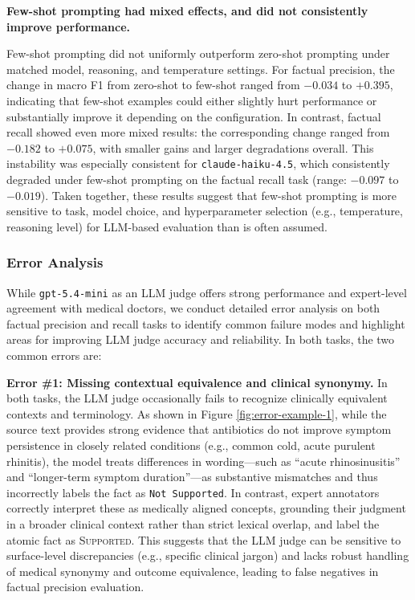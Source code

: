\documentclass{article}
\newcommand{\xhdr}[1]{%
  \noindent\textbf{#1.}
}
\begin{document}
\xhdr{Few-shot prompting had mixed effects, and did not consistently improve performance}
Few-shot prompting did not uniformly outperform zero-shot prompting under matched model, reasoning, and temperature settings. For factual precision, the change in macro F1 from zero-shot to few-shot ranged from $-0.034$ to $+0.395$, indicating that few-shot examples could either slightly hurt performance or substantially improve it depending on the configuration. In contrast, factual recall showed even more mixed results: the corresponding change ranged from $-0.182$ to $+0.075$, with smaller gains and larger degradations overall. This instability was especially consistent for \texttt{claude-haiku-4.5}, which consistently degraded under few-shot prompting on the factual recall task (range: $-0.097$ to $-0.019$). Taken together, these results suggest that few-shot prompting is more sensitive to task, model choice, and hyperparameter selection (e.g., temperature, reasoning level) for LLM-based evaluation than is often assumed.


\subsubsection{Error Analysis}\label{appendix:llm-judge-error-analysis}

While \texttt{gpt-5.4-mini} as an LLM judge offers strong performance and expert-level agreement with medical doctors, we conduct detailed error analysis on both factual precision and recall tasks to identify common failure modes and highlight areas for improving LLM judge accuracy and reliability. In both tasks, the two common errors are:

\xhdr{Error \#1: Missing contextual equivalence and clinical synonymy} In both tasks, the LLM judge occasionally fails to recognize clinically equivalent contexts and terminology. As shown in Figure \ref{fig:error-example-1}, while the source text provides strong evidence that antibiotics do not improve symptom persistence in closely related conditions (e.g., common cold, acute purulent rhinitis), the model treats differences in wording---such as ``acute rhinosinusitis'' and ``longer-term symptom duration''---as substantive mismatches and thus incorrectly labels the fact as \texttt{Not Supported}. In contrast, expert annotators correctly interpret these as medically aligned concepts, grounding their judgment in a broader clinical context rather than strict lexical overlap, and label the atomic fact as \textsc{Supported}. This suggests that the LLM judge can be sensitive to surface-level discrepancies (e.g., specific clinical jargon) and lacks robust handling of medical synonymy and outcome equivalence, leading to false negatives in factual precision evaluation.
\end{document}

